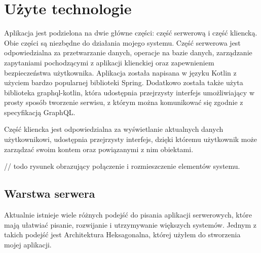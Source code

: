 \newpage
\section{Użyte technologie}
Aplikacja jest podzielona na dwie główne części: część serwerową i część kliencką. Obie części są niezbędne do działania mojego systemu.
Część serwerowa jest odpowiedzialna za przetwarzanie danych, operacje na bazie danych, zarządzanie zapytaniami pochodzącymi z aplikacji klienckiej oraz zapewnieniem bezpieczeństwa użytkownika. Aplikacja została napisana w języku Kotlin z użyciem bardzo popularnej biblioteki Spring. Dodatkowo została także użyta biblioteka graphql-kotlin, która udostępnia przejrzysty interfejs umożliwiający w prosty sposób tworzenie serwisu, z którym można komunikować się zgodnie z specyfikacją GraphQL.


Część kliencka jest odpowiedzialna za wyświetlanie aktualnych danych użytkownikowi, udostępnia przejrzysty interfejs, dzięki któremu użytkownik może zarządzać swoim kontem oraz powiązanymi z nim obiektami. 

// todo rysunek obrazujący połączenie i rozmieszczenie elementów systemu.

\subsection{Warstwa serwera}
Aktualnie istnieje wiele różnych podejść do pisania aplikacji serwerowych, które mają ułatwiać pisanie, rozwijanie i utrzymywanie większych systemów. Jednym z takich podejść jest Architektura Heksagonalna, której użyłem do stworzenia mojej aplikacji.
